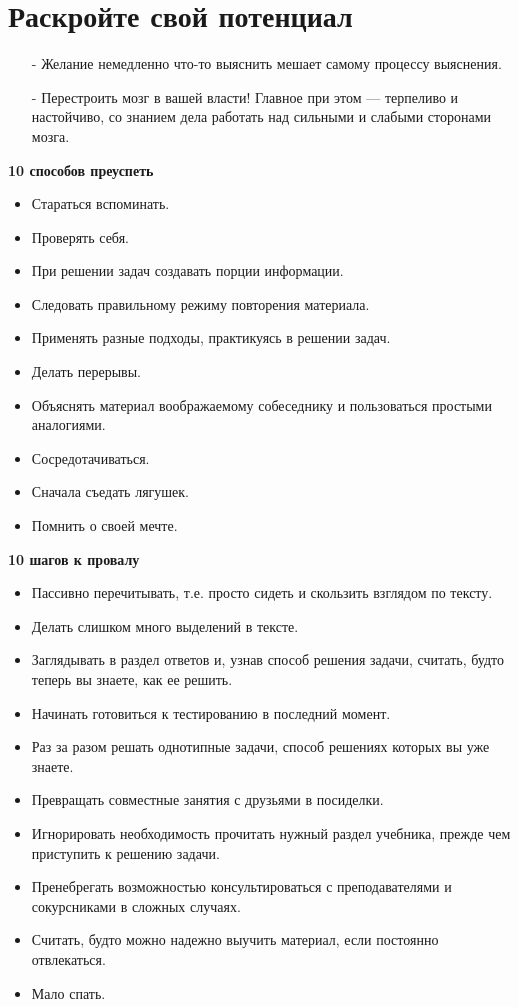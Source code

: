 \documentclass{article}
\begin{document}
\section{Раскройте свой потенциал}
\begin{itemize}
\item[-] Желание немедленно что-то выяснить мешает самому процессу выяснения.
\item[-] Перестроить мозг в вашей власти! Главное при этом --- терпеливо и настойчиво, со знанием дела работать над сильными и слабыми сторонами мозга. 
\end{itemize}
\textbf{10 способов преуспеть}
\begin{itemize}
\item Стараться вспоминать.
\item Проверять себя.
\item При решении задач создавать порции информации.
\item Следовать правильному режиму повторения материала.
\item Применять разные подходы, практикуясь в решении задач.
\item Делать перерывы.
\item Объяснять материал воображаемому собеседнику и пользоваться простыми аналогиями.
\item Сосредотачиваться.
\item Сначала съедать лягушек.
\item Помнить о своей мечте.
\end{itemize}
\textbf{10 шагов к провалу}
\begin{itemize}
\item Пассивно перечитывать, т.е. просто сидеть и скользить взглядом по тексту.
\item Делать слишком много выделений в тексте.
\item Заглядывать в раздел ответов и, узнав способ решения задачи, считать, будто теперь вы знаете, как ее решить.
\item Начинать готовиться к тестированию в последний момент.
\item Раз за разом решать однотипные задачи, способ решениях которых вы уже знаете.
\item Превращать совместные занятия с друзьями в посиделки.
\item Игнорировать необходимость прочитать нужный раздел учебника, прежде чем приступить к решению задачи.
\item Пренебрегать возможностью консультироваться с преподавателями и сокурсниками в сложных случаях.
\item Считать, будто можно надежно выучить материал, если постоянно отвлекаться.
\item Мало спать.
\end{itemize}
\end{document}
